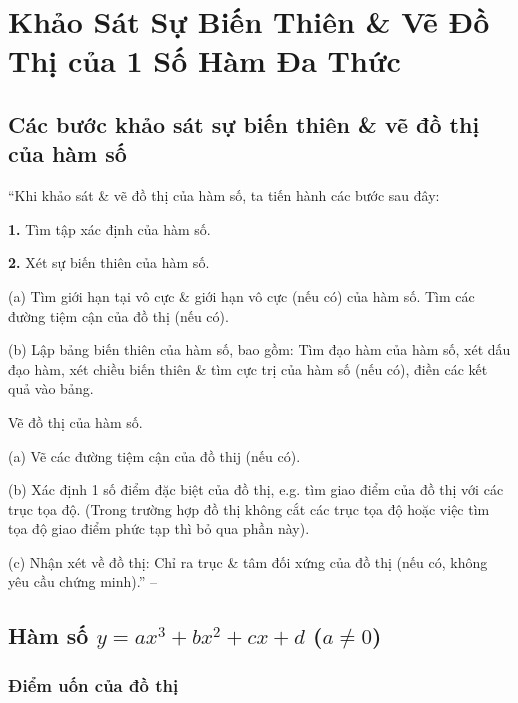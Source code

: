 \documentclass[oneside]{book}
\numberwithin{equation}{section}
\begin{document}

\section{Khảo Sát Sự Biến Thiên \& Vẽ Đồ Thị của 1 Số Hàm Đa Thức}

\subsection{Các bước khảo sát sự biến thiên \& vẽ đồ thị của hàm số}
``Khi khảo sát \& vẽ đồ thị của hàm số, ta tiến hành các bước sau đây:
\begin{enumerate*}
	\item[\textbf{1.}] Tìm tập xác định của hàm số.
	\item[\textbf{2.}] Xét sự biến thiên của hàm số.
	\begin{enumerate*}
		\item[(a)] Tìm giới hạn tại vô cực \& giới hạn vô cực (nếu có) của hàm số. Tìm các đường tiệm cận của đồ thị (nếu có).
		\item[(b)] Lập bảng biến thiên của hàm số, bao gồm: Tìm đạo hàm của hàm số, xét dấu đạo hàm, xét chiều biến thiên \& tìm cực trị của hàm số (nếu có), điền các kết quả vào bảng.
	\end{enumerate*}
	\item Vẽ đồ thị của hàm số.
	\begin{enumerate*}
		\item[(a)] Vẽ các đường tiệm cận của đồ thij (nếu có).
		\item[(b)] Xác định 1 số điểm đặc biệt của đồ thị, e.g. tìm giao điểm của đồ thị với các trục tọa độ. (Trong trường hợp đồ thị không cắt các trục tọa độ hoặc việc tìm tọa độ giao điểm phức tạp thì bỏ qua phần này).
		\item[(c)] Nhận xét về đồ thị: Chỉ ra trục \& tâm đối xứng của đồ thị (nếu có, không yêu cầu chứng minh).'' -- \cite[p. 37]{SGK_Toan_12_giai_tich_nang_cao}
	\end{enumerate*}
\end{enumerate*}

\subsection{Hàm số $y = ax^3 + bx^2 + cx + d$ ($a\ne 0$)}

\subsubsection{Điểm uốn của đồ thị}
\end{document}
